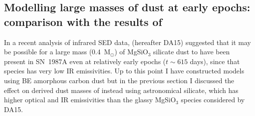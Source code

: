 \subsection{Modelling large masses of dust at early epochs: comparison 
with the results of \citet{Dwek2015}}
\label{dwek}

In a recent analysis of infrared SED data, \citet{Dwek2015} (hereafter 
DA15) suggested that it may be possible for a large mass (0.4~M$_\odot$) of 
MgSiO$_3$ silicate dust to have been present in SN~1987A even at 
relatively early epochs ($t\sim615$ days), since that species has very low 
IR emissivities.  Up to this point I have constructed models using 
\citet{Zubko1996} BE amorphous carbon dust but in the previous section I 
discussed the effect on derived dust masses of instead using 
\citet{Draine1984} astronomical silicate, which has higher optical and IR 
emissivities than the glassy MgSiO$_3$ species considered by DA15. 

